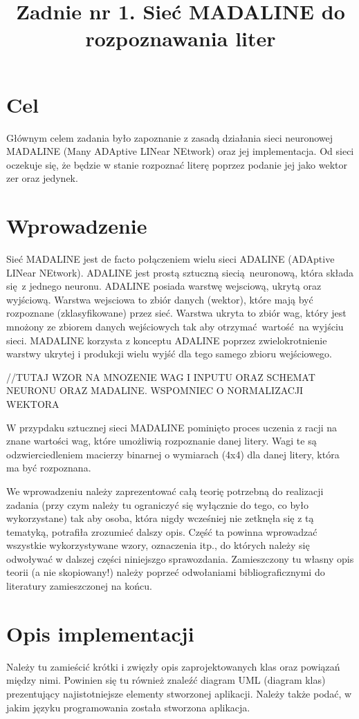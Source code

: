 \documentclass{classrep}
\author{
  \studentinfo{Szymon Łyszkowski}{206809}\and
  \studentinfo{Piotr Kluch}{206799}
}
\title{Zadnie nr 1. Sieć MADALINE do rozpoznawania liter}
\begin{document}
\maketitle

\section{Cel}
{
Głównym celem zadania było zapoznanie z zasadą działania sieci neuronowej MADALINE (Many ADAptive LINear NEtwork) oraz jej implementacja. Od sieci oczekuje się, że będzie w stanie rozpoznać literę poprzez podanie jej jako wektor zer oraz jedynek.}

\section{Wprowadzenie}
{Sieć MADALINE jest de facto połączeniem wielu sieci ADALINE (ADAptive LINear NEtwork). ADALINE jest prostą sztuczną siecią neuronową, która składa się z jednego neuronu. ADALINE posiada warstwę wejsciową, ukrytą oraz wyjściową. Warstwa wejsciowa to zbiór danych (wektor), które mają być rozpoznane (zklasyfikowane) przez sieć. Warstwa ukryta to zbiór wag, który jest mnożony ze zbiorem danych wejściowych tak aby otrzymać wartość na wyjściu sieci. MADALINE korzysta z konceptu ADALINE poprzez zwielokrotnienie warstwy ukrytej i produkcji wielu wyjść dla tego samego zbioru wejściowego.

//TUTAJ WZOR NA MNOZENIE WAG I INPUTU ORAZ SCHEMAT NEURONU ORAZ MADALINE. WSPOMNIEC O NORMALIZACJI WEKTORA

W przypdaku sztucznej sieci MADALINE pominięto proces uczenia z racji na znane wartości wag, które umożliwią rozpoznanie danej litery. Wagi te są odzwierciedleniem macierzy binarnej o wymiarach (4x4) dla danej litery, która ma być rozpoznana.
	
\color{blue}
We wprowadzeniu należy zaprezentować całą teorię potrzebną do realizacji
zadania (przy czym należy tu ograniczyć się wyłącznie do tego, co było
wykorzystane) tak aby osoba, która nigdy wcześniej nie zetknęła się z tą
tematyką, potrafiła zrozumieć dalszy opis. Część ta powinna wprowadzać
wszystkie wykorzystywane wzory, oznaczenia itp., do których należy się
odwoływać w dalszej części niniejszgo sprawozdania. Zamieszczony tu własny
opis teorii (a nie skopiowany!) należy poprzeć odwołaniami bibliograficznymi
do literatury zamieszczonej na końcu. }

\section{Opis implementacji}
{\color{blue}
Należy tu zamieścić krótki i zwięzły opis zaprojektowanych klas oraz powiązań
między nimi. Powinien się tu również znaleźć diagram UML  (diagram klas)
prezentujący najistotniejsze elementy stworzonej aplikacji. Należy także
podać, w jakim języku programowania została stworzona aplikacja. }
\end{document}
